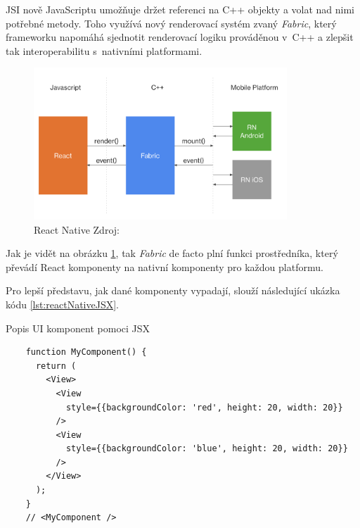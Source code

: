 JSI nově JavaScriptu umožňuje držet referenci na C++ objekty a volat nad nimi potřebné metody. \cite{reactNativeAboutNewArch} Toho využívá nový renderovací systém zvaný \textit{Fabric}, který 
frameworku napomáhá sjednotit renderovací logiku prováděnou v~C++ a zlepšit tak interoperabilitu s~nativními platformami.

\begin{figure}[H]
  \centering
  \includegraphics[width=0.85\textwidth]{react-natice-xplat-implementation-diagram.png}
  \caption{React Native Zdroj: \cite{imgReactNative} }
  \label{fig:react-natice-xplat-implementation-diagram}
\end{figure}





Jak je vidět na obrázku \ref{fig:react-natice-xplat-implementation-diagram}, tak \textit{Fabric} de facto plní funkci prostředníka, který převádí React 
komponenty na nativní komponenty pro každou platformu. 

Pro lepší představu, jak dané komponenty vypadají, slouží následující ukázka kódu \ref{lst:reactNativeJSX}.

\begin{listing}[H]
\caption{Popis UI komponent pomoci JSX}\label{lst:reactNativeJSX}
\begin{verbatim}
    function MyComponent() {
      return (
        <View>
          <View
            style={{backgroundColor: 'red', height: 20, width: 20}}
          />
          <View
            style={{backgroundColor: 'blue', height: 20, width: 20}}
          />
        </View>
      );
    }
    // <MyComponent />
\end{verbatim}
\end{listing}




